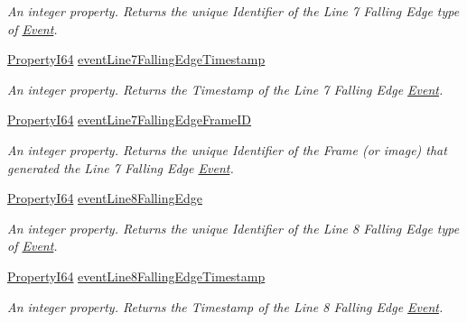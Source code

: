 \begin{DoxyCompactItemize}
\begin{DoxyCompactList}\small\item\em An integer property. Returns the unique Identifier of the Line 7 Falling Edge type of \hyperlink{classmv_i_m_p_a_c_t_1_1acquire_1_1_event}{Event}. \end{DoxyCompactList}\item 
\hyperlink{group___common_interface_ga81749b2696755513663492664a18a893}{Property\+I64} \hyperlink{classmv_i_m_p_a_c_t_1_1acquire_1_1_gen_i_cam_1_1_event_control_aaabd930b41f92bfad99e51933f5f647a}{event\+Line7\+Falling\+Edge\+Timestamp}
\begin{DoxyCompactList}\small\item\em An integer property. Returns the Timestamp of the Line 7 Falling Edge \hyperlink{classmv_i_m_p_a_c_t_1_1acquire_1_1_event}{Event}. \end{DoxyCompactList}\item 
\hyperlink{group___common_interface_ga81749b2696755513663492664a18a893}{Property\+I64} \hyperlink{classmv_i_m_p_a_c_t_1_1acquire_1_1_gen_i_cam_1_1_event_control_a5d7a2b38d2c86ed3896c44491b5925e1}{event\+Line7\+Falling\+Edge\+Frame\+I\+D}
\begin{DoxyCompactList}\small\item\em An integer property. Returns the unique Identifier of the Frame (or image) that generated the Line 7 Falling Edge \hyperlink{classmv_i_m_p_a_c_t_1_1acquire_1_1_event}{Event}. \end{DoxyCompactList}\item 
\hyperlink{group___common_interface_ga81749b2696755513663492664a18a893}{Property\+I64} \hyperlink{classmv_i_m_p_a_c_t_1_1acquire_1_1_gen_i_cam_1_1_event_control_aa961cf572a13e71e60eb148719126584}{event\+Line8\+Falling\+Edge}
\begin{DoxyCompactList}\small\item\em An integer property. Returns the unique Identifier of the Line 8 Falling Edge type of \hyperlink{classmv_i_m_p_a_c_t_1_1acquire_1_1_event}{Event}. \end{DoxyCompactList}\item 
\hyperlink{group___common_interface_ga81749b2696755513663492664a18a893}{Property\+I64} \hyperlink{classmv_i_m_p_a_c_t_1_1acquire_1_1_gen_i_cam_1_1_event_control_ae08581ed15befce57be75feb11c33cdc}{event\+Line8\+Falling\+Edge\+Timestamp}
\begin{DoxyCompactList}\small\item\em An integer property. Returns the Timestamp of the Line 8 Falling Edge \hyperlink{classmv_i_m_p_a_c_t_1_1acquire_1_1_event}{Event}. \end{DoxyCompactList}\item 

\end{DoxyCompactItemize}
